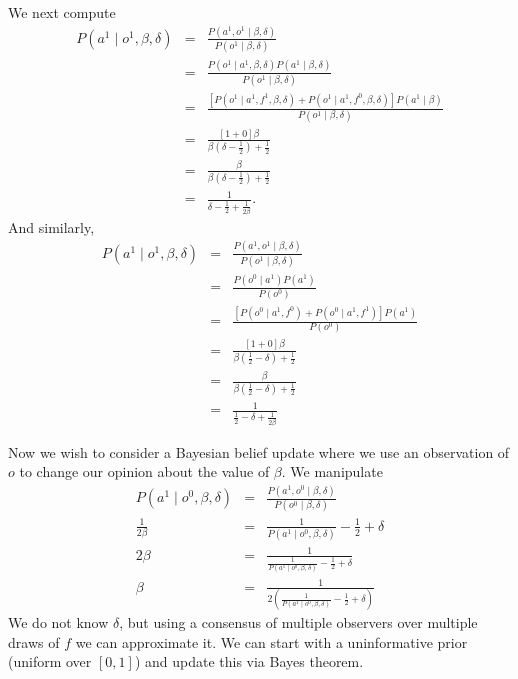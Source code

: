 \documentclass{amsart}
\theoremstyle{definition}
\theoremstyle{plain}
\numberwithin{equation}{section}
\begin{document}
We next compute%
\begin{eqnarray*}
P\left( a^{1}\mid o^{1},\beta ,\delta \right)  &=&\frac{P\left(
a^{1},o^{1}\mid \beta ,\delta \right) }{P\left( o^{1}\mid \beta ,\delta
\right) } \\
&=&\frac{P\left( o^{1}\mid a^{1},\beta ,\delta \right) P\left( a^{1}\mid
\beta ,\delta \right) }{P\left( o^{1}\mid \beta ,\delta \right) } \\
&=&\frac{\left[ P\left( o^{1}\mid a^{1},f^{1},\beta ,\delta \right) +P\left(
o^{1}\mid a^{1},f^{0},\beta ,\delta \right) \right] P\left( a^{1}\mid \beta
\right) }{P\left( o^{1}\mid \beta ,\delta \right) } \\
&=&\frac{\left[ 1+0\right] \beta }{\beta \left( \delta -\frac{1}{2}\right) +%
\frac{1}{2}} \\
&=&\frac{\beta }{\beta \left( \delta -\frac{1}{2}\right) +\frac{1}{2}} \\
&=&\frac{1}{\delta -\frac{1}{2}+\frac{1}{2\beta }}.
\end{eqnarray*}%
And similarly,%
\begin{eqnarray*}
P\left( a^{1}\mid o^{1},\beta ,\delta \right)  &=&\frac{P\left(
a^{1},o^{1}\mid \beta ,\delta \right) }{P\left( o^{1}\mid \beta ,\delta
\right) } \\
&=&\frac{P\left( o^{0}\mid a^{1}\right) P\left( a^{1}\right) }{P\left(
o^{0}\right) } \\
&=&\frac{\left[ P\left( o^{0}\mid a^{1},f^{0}\right) +P\left( o^{0}\mid
a^{1},f^{1}\right) \right] P\left( a^{1}\right) }{P\left( o^{0}\right) } \\
&=&\frac{\left[ 1+0\right] \beta }{\beta \left( \frac{1}{2}-\delta \right) +%
\frac{1}{2}} \\
&=&\frac{\beta }{\beta \left( \frac{1}{2}-\delta \right) +\frac{1}{2}} \\
&=&\frac{1}{\frac{1}{2}-\delta +\frac{1}{2\beta }}
\end{eqnarray*}

Now we wish to consider a Bayesian belief update where we use an observation
of $o$ to change our opinion about the value of $\beta $. We manipulate%
\begin{eqnarray*}
P\left( a^{1}\mid o^{0},\beta ,\delta \right)  &=&\frac{P\left(
a^{1},o^{0}\mid \beta ,\delta \right) }{P\left( o^{0}\mid \beta ,\delta
\right) } \\
\frac{1}{2\beta } &=&\frac{1}{P\left( a^{1}\mid o^{0},\beta ,\delta \right) }%
-\frac{1}{2}+\delta  \\
2\beta  &=&\frac{1}{\frac{1}{P\left( a^{1}\mid o^{0},\beta ,\delta \right) }-%
\frac{1}{2}+\delta } \\
\beta  &=&\frac{1}{2\left( \frac{1}{P\left( a^{1}\mid o^{0},\beta ,\delta
\right) }-\frac{1}{2}+\delta \right) }
\end{eqnarray*}%
We do not know $\delta $, but using a consensus of multiple observers over
multiple draws of $f$ we can approximate it. We can start with a
uninformative prior (uniform over $\left[ 0,1\right] $) and update this via
Bayes theorem.
\end{document}
